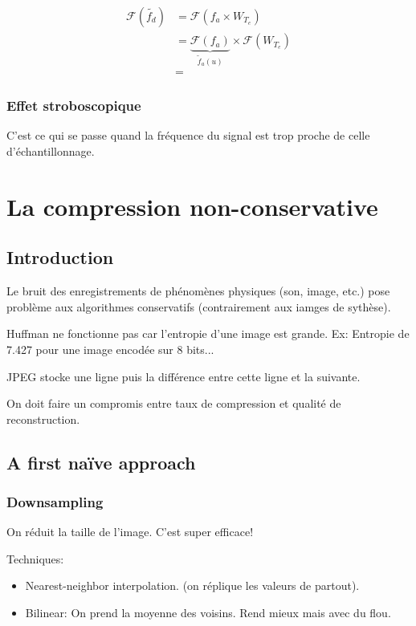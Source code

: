 \documentclass[a4paper,11pt]{article}
\newcommand{\ls}{\begin{itemize}}
\newcommand{\li}{\item}
\newcommand{\lend}{\end{itemize}}
\begin{document}
\begin{align*}
  \mathcal{F}(\tilde{f_d}) &= \mathcal{F}(f_a \times W_{T_e}) \\
                           &= \underbrace{\mathcal{F}(f_a)}_{\tilde{f}_a(u)} \times \mathcal{F}(W_{T_e}) \\
                           &= 
\end{align*}

\subsubsection{Effet stroboscopique}

C'est ce qui se passe quand la fréquence du signal est trop proche de celle
d'échantillonnage.

\section{La compression non-conservative}

\subsection{Introduction}

Le bruit des enregistrements de phénomènes physiques (son, image, etc.) pose
problème aux algorithmes conservatifs (contrairement aux iamges de sythèse).

Huffman ne fonctionne pas car l'entropie d'une image est grande. Ex: Entropie de
7.427 pour une image encodée sur 8 bits...

JPEG stocke une ligne puis la différence entre cette ligne et la suivante.

On doit faire un compromis entre taux de compression et qualité de
reconstruction.

\subsection{A first naïve approach}

\subsubsection{Downsampling}

On réduit la taille de l'image. C'est super efficace!

Techniques:
\ls
\li Nearest-neighbor interpolation. (on réplique les valeurs de partout).
\li Bilinear: On prend la moyenne des voisins. Rend mieux mais avec du flou.
\lend
\end{document}
